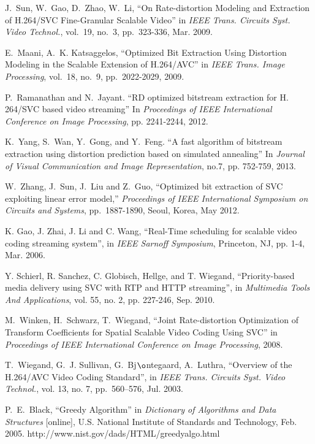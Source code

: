 \documentclass[journal]{IEEEtran}
\begin{document}
\begin{thebibliography}{1}
J.~Sun, W.~Gao, D.~Zhao, W.~Li, ``On Rate-distortion Modeling and Extraction of H.264/SVC Fine-Granular Scalable Video'' in {\em IEEE Trans. Circuits Syst. Video Technol.}, vol.~19, no.~3, pp.~323-336, Mar. 2009.

E.~Maani, A.~K. Katsaggelos, ``Optimized Bit Extraction Using Distortion Modeling in the Scalable Extension of H.264/AVC'' in {\em IEEE Trans. Image Processing}, vol.~18, no.~9, pp.~2022-2029, 2009.

P.~Ramanathan and N.~Jayant. ``RD optimized bitstream extraction for H. 264/SVC based video streaming'' In {\em Proceedings of IEEE International Conference on Image Processing}, pp. 2241-2244, 2012.

K.~Yang, S.~Wan, Y.~Gong, and Y.~Feng. ``A fast algorithm of bitstream extraction using distortion prediction based on simulated annealing'' In {\em Journal of Visual Communication and Image Representation}, no.7, pp. 752-759, 2013.

W.~Zhang, J.~Sun, J.~Liu and Z.~Guo, ``Optimized bit extraction of SVC exploiting linear error model,'' {\em Proceedings of IEEE International Symposium on Circuits and Systems}, pp.~1887-1890, Seoul, Korea, May 2012.

K. Gao, J. Zhai, J. Li and C. Wang, ``Real-Time scheduling for scalable video coding streaming system'', in {\em IEEE Sarnoff Symposium}, Princeton, NJ, pp. 1-4, Mar. 2006.

Y. Schierl, R. Sanchez, C. Globisch, Hellge, and T. Wiegand, ``Priority-based media delivery using SVC with RTP and HTTP streaming'', in {\em Multimedia Tools And Applications}, vol. 55, no. 2, pp. 227-246, Sep. 2010.

M.~Winken, H.~Schwarz, T.~Wiegand, ``Joint Rate-distortion Optimization of Transform Coefficients for Spatial Scalable Video Coding Using SVC'' in {\em Proceedings of IEEE International Conference on Image Processing}, 2008.

T.~Wiegand, G.~J. Sullivan, G.~Bj$\o$ntegaard, A.~Luthra, ``Overview of the H.264/AVC Video Coding Standard'', in {\em IEEE Trans. Circuits Syst. Video Technol.}, vol. 13, no. 7, pp.~560--576, Jul. 2003.

P.~E.~Black, ``Greedy Algorithm'' in {\em Dictionary of Algorithms and Data Structures} [online], U.S. National Institute of Standards and Technology, Feb. 2005.
\newblock http://www.nist.gov/dads/HTML/greedyalgo.html


\end{thebibliography}
\end{document}
